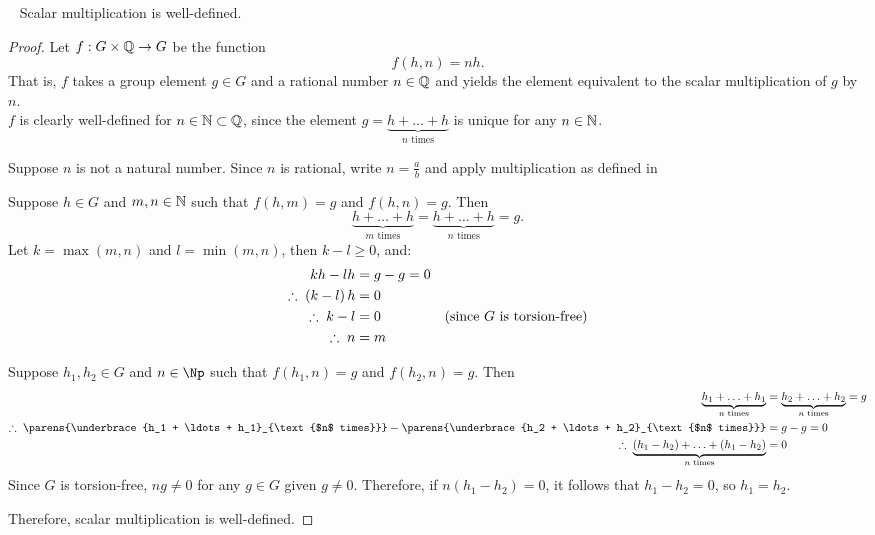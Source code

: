 \newpage
\begin{claim}~\label{claim:scalar-multiplication}
  Scalar multiplication is well-defined.

  \begin{proof}
    
    Let $f : G \times \mathbb{Q} \to G$ be the function
    \[ f(h, n) = nh. \]
    That is, $f$ takes a group element $g \in G$ and a rational number $n \in \mathbb{Q}$
    and yields the element equivalent to the scalar multiplication
    of $g$ by $n$.\\
    $f$ is clearly well-defined for $n \in \mathbb{N} \subset \mathbb{Q}$,
    since the element $g = \underbrace{h + \ldots + h}_{\text{$n$ times}}$
    is unique for any $n \in \mathbb{N}$.

    Suppose $n$ is not a natural number.
    Since $n$ is rational, write $n = \frac{a}{b}$ and apply multiplication
    as defined in 
    \begin{enumroman}
    \item Suppose $h \in G$ and $m, n \in \mathbb{N}$ such that $f(h, m) = g$ and $f(h, n) = g$.
    Then
      \[
        \underbrace{h + \ldots + h}_{\text{$m$ times}}
        = \underbrace{h + \ldots + h}_{\text{$n$ times}} = g.
      \]
    Let $k = \max(m, n)$ and $l = \min(m, n)$, then $k - l \geq 0$, and:
    \begin{align*}
      kh - lh &= g - g = 0 \\
      \therefore\; (k - l)\, h &= 0 \\
      \therefore\; k - l &= 0 &\text{(since $G$ is torsion-free)} \\
      \therefore\; n &= m
    \end{align*}

    \item Suppose $h_1, h_2 \in G$  and $n \in \Np$ such that
    $f(h_1, n) = g$ and $f(h_2, n) = g$.
    Then
    \begin{align*}
        \underbrace{h_1 + \ldots + h_1}_{\text{$n$ times}}
        &= \underbrace{h_2 + \ldots + h_2}_{\text{$n$ times}} = g \\
      \Therefore \parens{\underbrace{h_1 + \ldots + h_1}_{\text{$n$ times}}}
      - \parens{\underbrace{h_2 + \ldots + h_2}_{\text{$n$ times}}} &= g - g = 0 \\
      \Therefore \underbrace{(h_1 - h_2) + \ldots + (h_1 - h_2)}_{\text{$n$ times}} &= 0
    \end{align*}
    Since $G$ is torsion-free, $ng \neq 0$ for any $g \in G$ given $g \neq 0$.
    Therefore, if $n(h_1 - h_2) = 0$, it follows that $h_1 -h_2 = 0$,
    so $h_1 = h_2$.
  \end{enumroman}
  \step
  Therefore, scalar multiplication is well-defined.
  \end{proof}

\end{claim}
